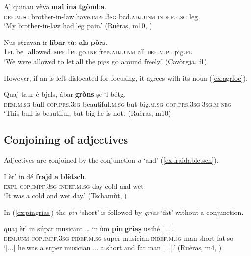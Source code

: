 \ea
\label{ex:noagr:6}
\gll   Al quinau vèva \textbf{mal} \textbf{ina} \textbf{tgòmba}. \\
\textsc{def.m.sg} brother-in-law have.\textsc{impf.3sg} bad.\textsc{adj.unm} \textsc{indef.f.sg} leg \\
\glt `My brother-in-law had leg pain.' (Ruèras, m10, )
\z

\ea
\label{ex:noagr:7}
\gll Nus stgavan ir \textbf{líbar} tùt \textbf{als} \textbf{pòrs}.\\
 \textsc{1pl} be\_allowed.\textsc{impf.1pl}  go.\textsc{inf} free.\textsc{adj.unm} all  \textsc{def.m.pl} pig.\textsc{pl} \\
\glt `We were allowed to let all the pigs go around freely.' (Cavòrgja, f1)
\z

However, if an  is left-dislocated for focusing, it agrees with its noun (\ref{ex:agrfoc}).

\ea
\label{ex:agrfoc}
\gll Quaj taur è bjals, ábar \textbf{gròns} ṣè `l bétg.\\
\textsc{dem.m.sg} bull \textsc{cop.prs.3sg} beautiful.\textsc{m.sg} but big.\textsc{m.sg} \textsc{cop.prs.3sg} \textsc{3sg.m} \textsc{neg}\\
\glt `This bull is beautiful, but big he is not.' (Ruèras, m10)
\z

\subsection{Conjoining of adjectives}\label{sec:3.3.8}
Adjectives are conjoined by the conjunction \textit{a} `and' (\ref{ex:fraidabletsch}).

\ea
\label{ex:fraidabletsch}
\gll I èr' in dé \textbf{frajd} \textbf{a} \textbf{blètsch}.\\
\textsc{expl} \textsc{cop.impf.3sg} \textsc{indef.m.sg} day cold and wet\\
\glt `It was a cold and wet day.' (Tschamùt, \citealt[18]{Büchli1966})
\z

In (\ref{ex:pingrias}) the  \textit{pin} `short' is followed by \textit{grias} `fat' without a conjunction.

\ea
\label{ex:pingrias}
\gll [...] quaj èr’ in súpar musicant … in ùm \textbf{pin} \textbf{griaṣ} usché [...].\\
{} \textsc{dem.unm} \textsc{cop.impf.3sg} \textsc{indef.m.sg} super musician {} \textsc{indef.m.sg} man short fat so \\
\glt `[...] he was a super musician ... a short and fat man [...].' (Ruèras, m4, )
\z

